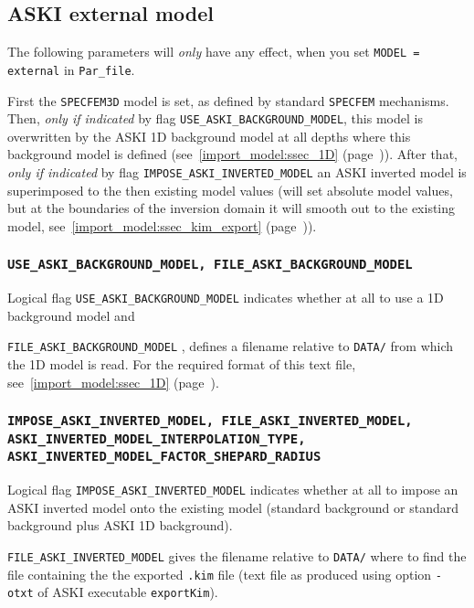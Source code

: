 \documentclass[12pt,a4paper]{article}
\newcommand{\lcode}[1]{\nolinkurl{#1}}
\newcommand{\lcodetitle}[1]{ {\ttfamily #1} }
\newcommand{\ASKI}{ {\ttfamily ASKI} }
\newcommand{\myref}[1]{\ref{#1} (page~\pageref{#1})}
\begin{document}
\subsection{\lcodetitle{ASKI} external model} \label{Par_file_ASKI,sub:ext_model}
The following parameters will \emph{only} have any effect, when you set \lcode{MODEL = external}
in \lcode{Par_file}.

First the \lcode{SPECFEM3D} model is set, as defined by standard \lcode{SPECFEM} mechanisms. 
Then, \emph{only if indicated} by flag \lcode{USE_ASKI_BACKGROUND_MODEL}, this model is overwritten 
by the \ASKI{} 1D background model at all depths where this background model is defined 
(see~\myref{import_model:ssec_1D}).
After that, \emph{only if indicated} by flag \lcode{IMPOSE_ASKI_INVERTED_MODEL} an \ASKI{} inverted 
model is superimposed to the then existing model values (will set absolute model values, 
but at the boundaries of the inversion domain it will smooth out to the existing model, 
see~\myref{import_model:ssec_kim_export}).

\subsubsection*{\lcode{USE_ASKI_BACKGROUND_MODEL, FILE_ASKI_BACKGROUND_MODEL}}
Logical flag \lcode{USE_ASKI_BACKGROUND_MODEL} indicates whether at all to use a 1D background model and

\lcode{FILE_ASKI_BACKGROUND_MODEL} , defines a filename relative to \lcode{DATA/} from which the 1D model
is read. For the required format of this text file, see~\myref{import_model:ssec_1D}.

\subsubsection*{\lcode{IMPOSE_ASKI_INVERTED_MODEL, FILE_ASKI_INVERTED_MODEL, ASKI_INVERTED_MODEL_INTERPOLATION_TYPE, 
ASKI_INVERTED_MODEL_FACTOR_SHEPARD_RADIUS}}
Logical flag \lcode{IMPOSE_ASKI_INVERTED_MODEL} indicates whether at all to impose an \ASKI{} inverted model
onto the existing model (standard background or standard background plus \ASKI{} 1D background).

\lcode{FILE_ASKI_INVERTED_MODEL} gives the filename relative to \lcode{DATA/} where to find the file containing
the the exported \lcode{.kim} file (text file as produced using option \lcode{-otxt} of \ASKI{} executable 
\lcode{exportKim}).
\end{document}

